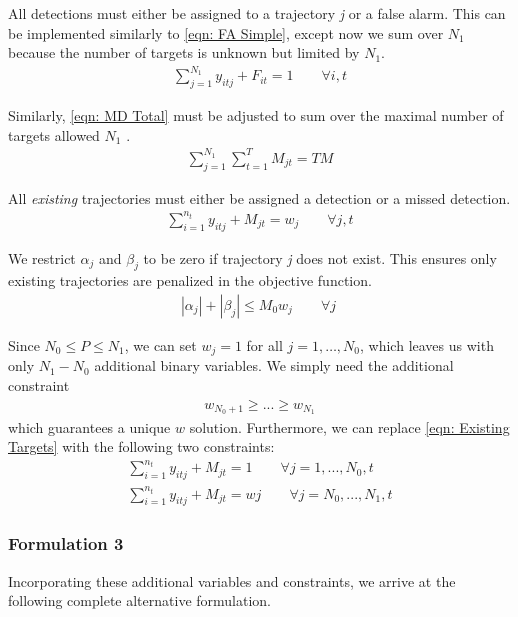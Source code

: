 \documentclass[journal]{IEEEtran}
\begin{document}
All detections must either be assigned to a trajectory \textit{j} or a false alarm. This can be implemented similarly to \eqref{eqn: FA Simple}, except now we sum over $N_{1}$ because the number of targets is unknown but limited by $N_{1}$.
\begin{align}
\sum_{j=1}^{N_{1}} y_{itj} + F_{it} = 1 \qquad \forall i,t
\end{align}

Similarly, \eqref{eqn: MD Total} must be adjusted to sum over the maximal number of targets allowed $N_{1}$ . 
\begin{align}
\sum_{j=1}^{N_{1}} \sum_{t=1}^{T} M_{jt} = TM
\end{align}


All \textit{existing} trajectories must either be assigned a detection or a missed detection. 
\begin{align}\label{eqn: Existing Targets}
\sum_{i=1}^{n_{t}} y_{itj} + M_{jt} = w_{j} \qquad \forall j,t
\end{align}

We restrict $\alpha_{j}$ and $\beta_{j}$ to be zero if trajectory \textit{j} does not exist. This ensures only existing trajectories are penalized in the objective function. 
\begin{align}
|\alpha_{j}|+|\beta_{j}| \leq M_{0}w_{j}\qquad \forall j\
\end{align}

Since $N_{0} \leq P \leq N_{1}$, we can set $w_j=1$ for all $j=1,\ldots,N_0$, which leaves us with only $N_1-N_0$ additional binary variables. We simply need the additional constraint
\begin{align}
w_{N_0+1}\geq ...\geq w_{N_1}
\end{align}
which guarantees a unique $w$ solution.
Furthermore, we can replace \eqref{eqn: Existing Targets} with the following two constraints:
\begin{align}
	\sum_{i=1}^{n_{t}} y_{itj} + M_{jt} = 1 \qquad \forall j=1,...,N_{0},t\\
	\sum_{i=1}^{n_{t}} y_{itj} + M_{jt} = w{j} \qquad \forall j=N_{0},...,N_{1},t
\end{align}

\subsubsection{Formulation 3}

Incorporating these additional variables and constraints, we arrive at the following complete alternative formulation.
\end{document}
